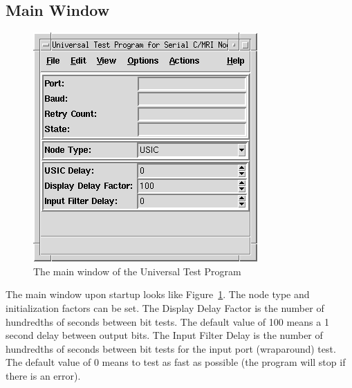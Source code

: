 \subsection{Main Window}
\begin{figure}[hbpt]
\begin{centering}
\includegraphics{UTMain.png}
\caption{The main window of the Universal Test Program}
\label{fig:ut:main}
\end{centering}
\end{figure}
The main window upon startup looks like Figure~\ref{fig:ut:main}. The
node type and initialization factors can be set.  The Display Delay
Factor is the number of hundredths of seconds between bit tests.  The
default value of 100 means a 1 second delay between output bits.  The
Input Filter Delay is the number of hundredths of seconds between bit
tests for the input port (wraparound) test.  The default value of 0
means to test as fast as possible (the program will stop if there is an
error).

